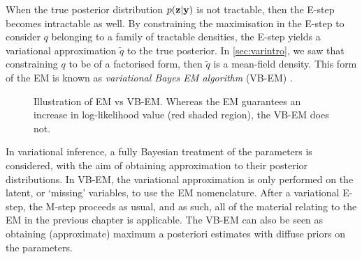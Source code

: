 When the true posterior distribution $p({\mathbf z}|{\mathbf y})$ is not tractable, then the E-step becomes intractable as well.
By constraining the maximisation in the E-step to consider $q$ belonging to a family of tractable densities, the E-step yields a variational approximation $\tilde q$ to the true posterior.
In \cref{sec:varintro}, we saw that constraining $q$ to be of a factorised form, then $\tilde q$ is a mean-field density.
This form of the EM is known as \emph{variational Bayes EM algorithm} (VB-EM) \citep{beal2003}.

\begin{figure}[p]
  \centering
  \energyemEstep \hspace{0.5cm}
  \energyvbEstep
  \energyemMstep \hspace{0.5cm}
  \energyvbMstepa
  \energyemMstepfade \hspace{0.5cm}
  \energyvbMstepb
  \energyemMstepfade \hspace{0.5cm}
  \energyvbMstepc
  \vspace{-1em} 
  \caption{Illustration of EM vs VB-EM. Whereas the EM guarantees an increase in log-likelihood value (red shaded region), the VB-EM does not.}
\end{figure}

In variational inference, a fully Bayesian treatment of the parameters is considered, with the aim of obtaining approximation to their posterior distributions.
In VB-EM, the variational approximation is only performed on the latent, or `missing' variables, to use the EM nomenclature.
After a variational E-step, the M-step proceeds as usual, and as such, all of the material relating to the EM in the previous chapter is applicable.
The VB-EM can also be seen as obtaining (approximate) maximum a posteriori estimates with diffuse priors on the parameters.

